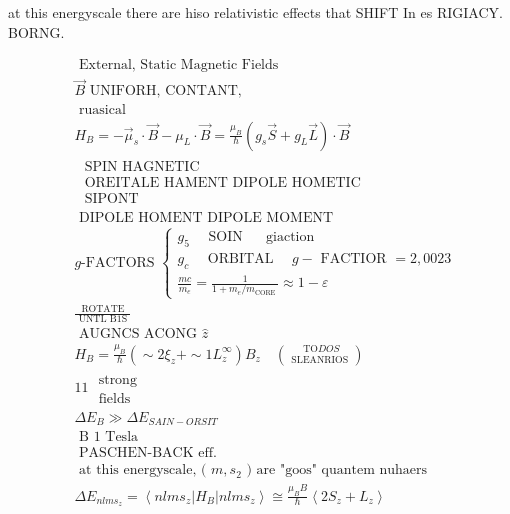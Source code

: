 \documentclass[10pt]{article}
\begin{document}
at this energyscale there are hiso relativistic effects that SHIFT In es RIGIACY. BORNG.

$$
\begin{aligned}
& \text { External, Static Magnetic Fields } \\
& \vec{B} \text { UNIFORH, CONTANT, } \\
& \text { ruasical } \\
& H_{B}=-\vec{\mu}_{s} \cdot \vec{B}-\mu_{L} \cdot \vec{B}=\frac{\mu_{B}}{\hbar}\left(g_{s} \vec{S}+g_{L} \vec{L}\right) \cdot \vec{B} \\
& \begin{array}{l}
\text { SPIN HAGNETIC } \\
\text { OREITALE HAMENT DIPOLE HOMETIC } \\
\text { SIPONT }
\end{array} \\
& \text { DIPOLE HOMENT DIPOLE MOMENT } \\
& g \text {-FACTORS }\left\{\begin{array}{l}
g_{5} \quad \text { SOIN } \quad \text { giaction } \\
g_{c} \quad \text { ORBITAL } \quad g-\text { FACTIOR }=2,0023 \\
\frac{m c}{m_{e}}=\frac{1}{1+m_{e} / m_{\text {CORE }}} \approx 1-\varepsilon
\end{array}\right. \\
& \frac{\text { ROTATE }}{\text { UNTL B1S }} \\
& \text { AUGNCS ACONG } \hat{z} \\
& H_{B}=\frac{\mu_{B}}{\hbar}\left(\sim 2 \xi_{z}+\sim 1 L_{z}^{\infty}\right) B_{z} \quad\binom{\text { TO} D O S}{\text { SLEANRIOS }} \\
& 11 \begin{array}{c}
\text { strong } \\
\text { fields }
\end{array} \\
& \Delta E_{B} \gg \Delta E_{S A I N-O R S I T} \\
& \text { B~1 Tesla } \\
& \text { PASCHEN-BACK eff. } \\
& \text { at this energyscale, ( } m, s_{2} \text { ) are "goos" quantem nuhaers } \\
& \Delta E_{n l m s_{z}}=\left\langle n l m s_{z}\right| H_{B}\left|n l m s_{z}\right\rangle \cong \frac{\mu_{B} B}{\hbar}\left\langle 2 S_{z}+L_{z}\right\rangle
\end{aligned}
$$
\end{document}
